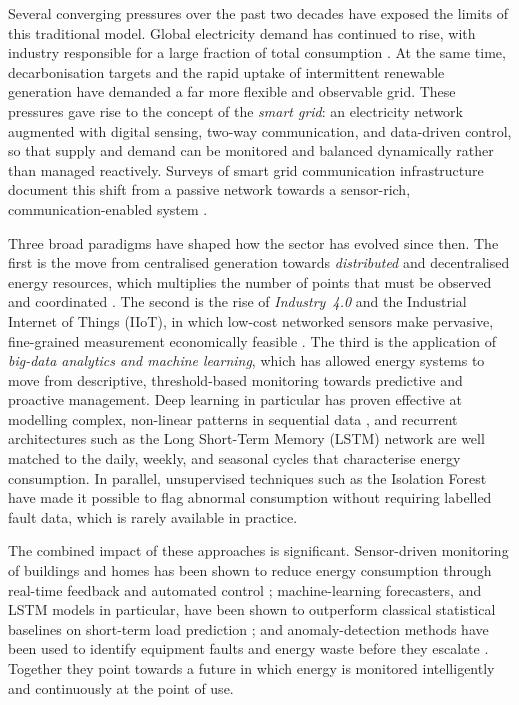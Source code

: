 \documentclass[conference]{IEEEtran}
\begin{document}
Several converging pressures over the past two decades have exposed the limits
of this traditional model. Global electricity demand has continued to rise, with
industry responsible for a large fraction of total consumption
\cite{international2022international}. At the same time, decarbonisation targets
and the rapid uptake of intermittent renewable generation have demanded a far
more flexible and observable grid. These pressures gave rise to the concept of
the \emph{smart grid}: an electricity network augmented with digital sensing,
two-way communication, and data-driven control, so that supply and demand can be
monitored and balanced dynamically rather than managed reactively. Surveys of
smart grid communication infrastructure document this shift from a passive
network towards a sensor-rich, communication-enabled system
\cite{fan2012smart,yan2012survey}.

Three broad paradigms have shaped how the sector has evolved since then. The
first is the move from centralised generation towards \emph{distributed} and
decentralised energy resources, which multiplies the number of points that must
be observed and coordinated \cite{silva2023iot}. The second is the rise of
\emph{Industry~4.0} and the Industrial Internet of Things (IIoT), in which
low-cost networked sensors make pervasive, fine-grained measurement economically
feasible \cite{munirathinam2020industry}. The third is the application of
\emph{big-data analytics and machine learning}, which has allowed energy systems
to move from descriptive, threshold-based monitoring towards predictive and
proactive management. Deep learning in particular has proven effective at
modelling complex, non-linear patterns in sequential data \cite{lecun2015deep},
and recurrent architectures such as the Long Short-Term Memory (LSTM) network
\cite{hochreiter1997long} are well matched to the daily, weekly, and seasonal
cycles that characterise energy consumption. In parallel, unsupervised
techniques such as the Isolation Forest \cite{liu2008isolation} have made it
possible to flag abnormal consumption without requiring labelled fault data,
which is rarely available in practice.

The combined impact of these approaches is significant. Sensor-driven monitoring
of buildings and homes has been shown to reduce energy consumption through
real-time feedback and automated control \cite{alaa2017review,hafeez2020efficient};
machine-learning forecasters, and LSTM models in particular, have been shown to
outperform classical statistical baselines on short-term load prediction
\cite{kong2017short,raza2015review}; and anomaly-detection methods have been used
to identify equipment faults and energy waste before they escalate
\cite{himeur2021artificial}. Together they point towards a future in which energy
is monitored intelligently and continuously at the point of use.
\end{document}
